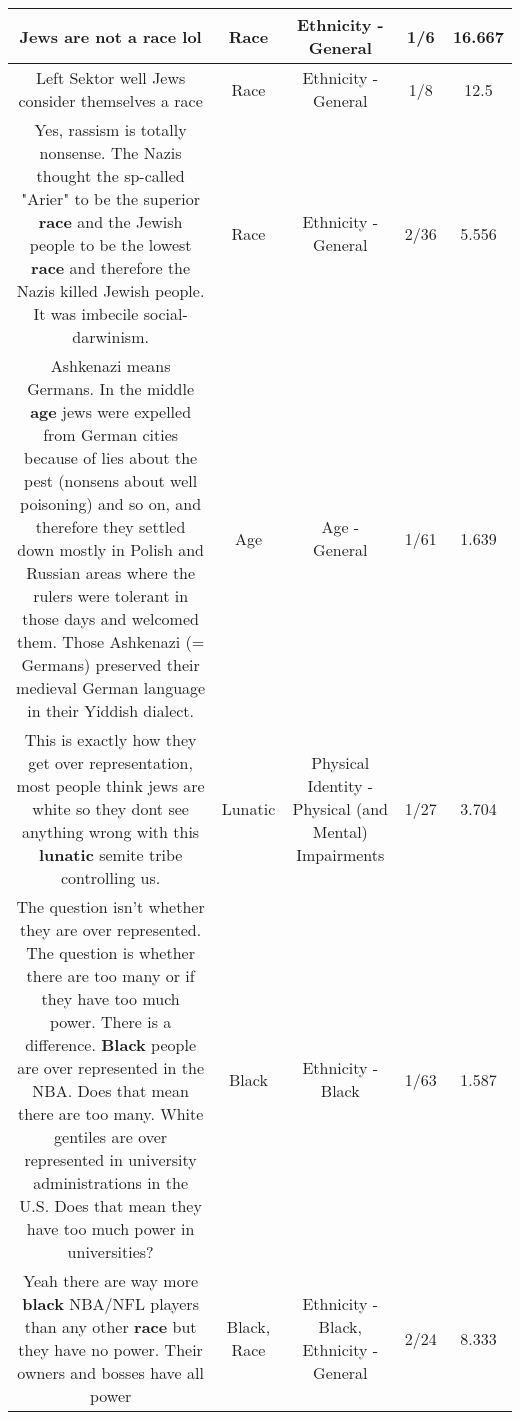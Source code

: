 \documentclass[11pt]{article}
\newlength\mylength
\begin{document}
\begin{center}
\begin{longtable}{|C{.65\mylength}|C{.30\mylength}|C{.12\mylength}|C{.12\mylength}|C{.12\mylength}|}
  \small Jews are not a \textbf{race} lol\normalsize   & Race & Ethnicity - General & 1/6 & 16.667 \\  \hline
  \small Left Sektor well Jews consider themselves a race\normalsize   & Race & Ethnicity - General & 1/8 & 12.5 \\  \hline
  \small Yes, rassism is totally nonsense. The Nazis thought the sp-called "Arier" to be the superior \textbf{race} and the Jewish people to be the lowest \textbf{race} and therefore the Nazis killed Jewish people. It was imbecile social-darwinism.\normalsize   & Race & Ethnicity - General & 2/36 & 5.556 \\  \hline
  \small Ashkenazi means Germans. In the middle \textbf{age} jews were expelled from German cities because of lies about the pest (nonsens about well poisoning) and so on, and therefore they settled down mostly in Polish and Russian areas where the rulers were tolerant in those days and welcomed them. Those Ashkenazi (= Germans) preserved their medieval German language in their Yiddish dialect.\normalsize   & Age & Age - General & 1/61 & 1.639 \\  \hline
  \small This is exactly how they get over representation, most people think jews are white so they dont see anything wrong with this \textbf{lunatic} semite tribe controlling us.\normalsize   & Lunatic & Physical Identity - Physical (and Mental) Impairments & 1/27 & 3.704 \\  \hline
  \small The question isn't whether they are over represented. The question is whether there are too many or if they have too much power. There is a difference. \textbf{Black} people are over represented in the NBA. Does that mean there are too many. White gentiles are over represented in university administrations in the U.S. Does that mean they have too much power in universities?\normalsize   & Black & Ethnicity - Black & 1/63 & 1.587 \\  \hline
  \small Yeah there are way more \textbf{black} NBA/NFL players than any other \textbf{race} but they have no power. Their owners and bosses have all power\normalsize   & Black, Race & Ethnicity - Black, Ethnicity - General & 2/24 & 8.333 \\  \hline

\end{longtable}
\end{center}
\end{document}
